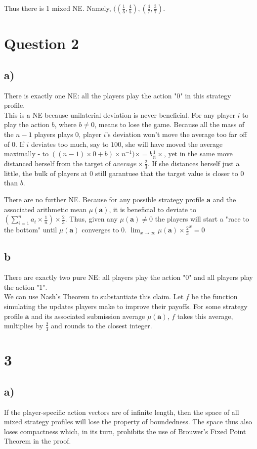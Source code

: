 \documentclass[10pt,a4paper]{article}
\begin{document}
Thus there is 1 mixed NE. Namely, $((\tfrac{1}{5},\tfrac{4}{5}),(\tfrac{4}{7},\tfrac{3}{7})$.
\section*{Question 2}
\subsection*{a)}
There is exactly one NE: all the players play the action "0" in this strategy profile.\\
This is a NE because unilaterial deviation is never beneficial. For any player $i$ to play the action $b$, where $b\neq 0$, means to lose the game. Because all the mass of the $n-1$ players plays $0$, player $i$'s deviation won't move the average too far off of $0$. If $i$ deviates too much, say to $100$, she will have moved the average maximally - to $((n-1)\times 0 + b)\times n^{-1})\times=b \tfrac{1}{n}\times$, yet in the same move distanced herself from the target of $average \times \tfrac{2}{3}$. If she distances herself just a little, the bulk of players at $0$ still garantuee that the target value is closer to $0$ than $b$.

There are no further NE. Because for any possible strategy profile $\textbf{a}$ and the associated arithmetic mean $\mu(\textbf{a})$, it is beneficial to deviate to $(\sum^n_{i=1} a_i \times \tfrac{1}{n})\times \tfrac{2}{3}$. Thus, given any $\mu(\textbf{a})\neq 0$ the players will start a "race to the bottom" until $\mu(\textbf{a})$ converges to $0$. $\lim_{x\rightarrow \infty} \mu(\textbf{a})\times \tfrac{2}{3}^x=0$
\subsection*{b}
There are exactly two pure NE: all players play the action "0" and all players play the action "1". \\
We can use Nash's Theorem to substantiate this claim. Let $f$ be the function simulating the updates players make to improve their payoffs. For some strategy profile $\textbf{a}$ and its associated submission average $\mu(\textbf{a})$, $f$ takes this average, multiplies by $\tfrac{2}{3}$ and rounds to the closest integer.

\section*{3}
\subsection*{a)}
If the player-specific action vectors are of infinite length, then the space of all mixed strategy profiles will lose the property of boundedness. The space thus also loses compactness which, in its turn, prohibits the use of Brouwer's Fixed Point Theorem in the proof.
\end{document}
